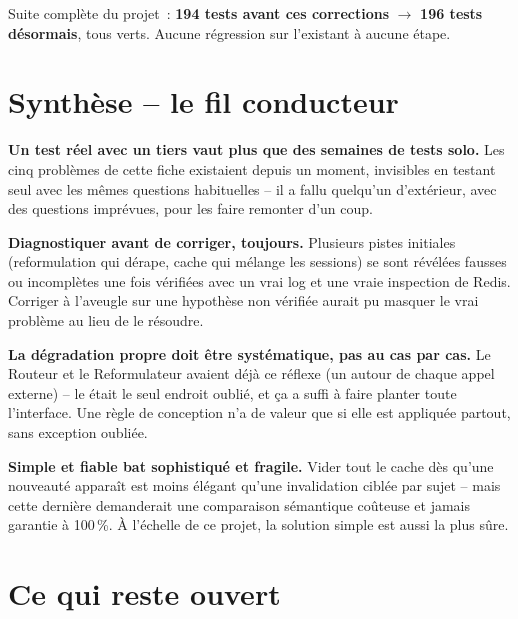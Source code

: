 \documentclass[11pt,a4paper]{article}
\newcommand{\code}[1]{\texttt{\detokenize{#1}}}
\begin{document}
Suite compl\`ete du projet~: \textbf{194 tests avant ces corrections} $\rightarrow$
\textbf{196 tests d\'esormais}, tous verts. Aucune r\'egression sur l'existant \`a
aucune \'etape.

\section{Synth\`ese -- le fil conducteur}

\textbf{Un test r\'eel avec un tiers vaut plus que des semaines de tests solo.} Les
cinq probl\`emes de cette fiche existaient depuis un moment, invisibles en testant
seul avec les m\^emes questions habituelles -- il a fallu quelqu'un d'ext\'erieur, avec
des questions impr\'evues, pour les faire remonter d'un coup.

\textbf{Diagnostiquer avant de corriger, toujours.} Plusieurs pistes initiales
(reformulation qui d\'erape, cache qui m\'elange les sessions) se sont r\'ev\'el\'ees
fausses ou incompl\`etes une fois v\'erifi\'ees avec un vrai log et une vraie inspection
de Redis. Corriger \`a l'aveugle sur une hypoth\`ese non v\'erifi\'ee aurait pu masquer
le vrai probl\`eme au lieu de le r\'esoudre.

\textbf{La d\'egradation propre doit \^etre syst\'ematique, pas au cas par cas.} Le
Routeur et le Reformulateur avaient d\'ej\`a ce r\'eflexe (un \code{try/except} autour de
chaque appel externe) -- le \code{Generateur} \'etait le seul endroit oubli\'e, et \c{c}a a
suffi \`a faire planter toute l'interface. Une r\`egle de conception n'a de valeur que
si elle est appliqu\'ee partout, sans exception oubli\'ee.

\textbf{Simple et fiable bat sophistiqu\'e et fragile.} Vider tout le cache d\`es qu'une
nouveaut\'e appara\^it est moins \'el\'egant qu'une invalidation cibl\'ee par sujet -- mais
cette derni\`ere demanderait une comparaison s\'emantique co\^uteuse et jamais garantie
\`a 100\,\%. \`A l'\'echelle de ce projet, la solution simple est aussi la plus s\^ure.

\section{Ce qui reste ouvert}
\end{document}

